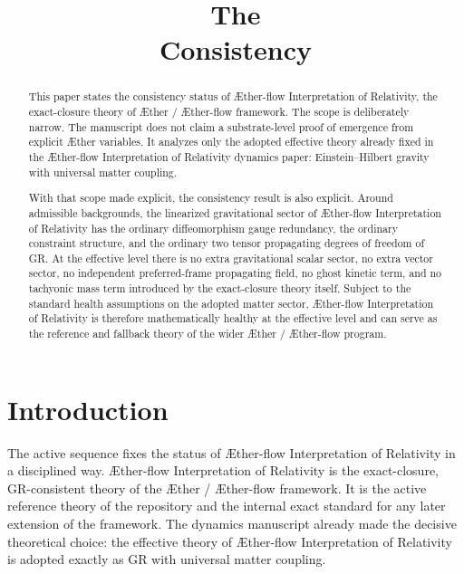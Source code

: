\documentclass[11pt]{article}
\title{\textbf{The \TheoryName{}}\\[0.4em]
\large Consistency}
\author{}
\date{}
\newcommand{\Aether}{\AE{}ther}
\newcommand{\Aflow}{\AE{}ther-flow}
\newcommand{\TheoryName}{\Aflow{} Interpretation of Relativity}
\newcommand{\TheoryProgram}{\Aether{} / \Aflow{} framework}
\begin{document}
\maketitle

\begin{abstract}
This paper states the consistency status of \TheoryName{}, the exact-closure theory of \TheoryProgram{}. The scope is deliberately narrow. The manuscript does not claim a substrate-level proof of emergence from explicit \Aether{} variables. It analyzes only the adopted effective theory already fixed in the \TheoryName{} dynamics paper: Einstein--Hilbert gravity with universal matter coupling.

With that scope made explicit, the consistency result is also explicit. Around admissible backgrounds, the linearized gravitational sector of \TheoryName{} has the ordinary diffeomorphism gauge redundancy, the ordinary constraint structure, and the ordinary two tensor propagating degrees of freedom of GR. At the effective level there is no extra gravitational scalar sector, no extra vector sector, no independent preferred-frame propagating field, no ghost kinetic term, and no tachyonic mass term introduced by the exact-closure theory itself. Subject to the standard health assumptions on the adopted matter sector, \TheoryName{} is therefore mathematically healthy at the effective level and can serve as the reference and fallback theory of the wider \Aether{} / \Aflow{} program.
\end{abstract}

\section{Introduction}

The active sequence fixes the status of \TheoryName{} in a disciplined way. \TheoryName{} is the exact-closure, GR-consistent theory of the \TheoryProgram{}. It is the active reference theory of the repository and the internal exact standard for any later extension of the framework. The dynamics manuscript already made the decisive theoretical choice: the effective theory of \TheoryName{} is adopted exactly as GR with universal matter coupling.
\end{document}
